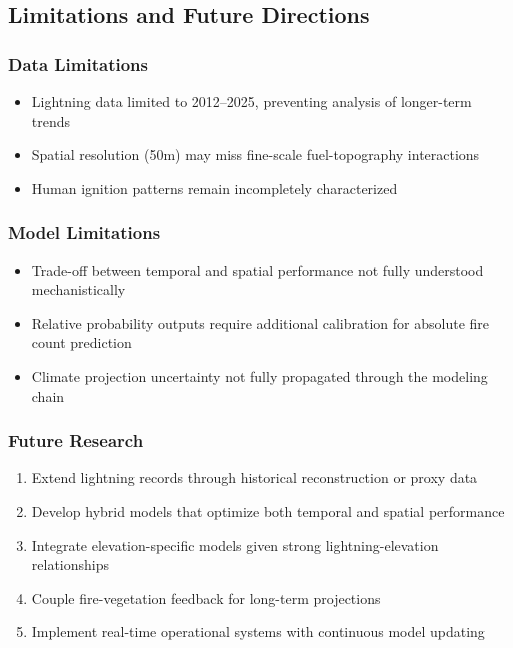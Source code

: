 \documentclass[11pt,a4paper]{article}
\begin{document}
\subsection{Limitations and Future Directions}

\subsubsection{Data Limitations}
\begin{itemize}
    \item Lightning data limited to 2012--2025, preventing analysis of longer-term trends
    \item Spatial resolution (50m) may miss fine-scale fuel-topography interactions
    \item Human ignition patterns remain incompletely characterized
\end{itemize}

\subsubsection{Model Limitations}
\begin{itemize}
    \item Trade-off between temporal and spatial performance not fully understood mechanistically
    \item Relative probability outputs require additional calibration for absolute fire count prediction
    \item Climate projection uncertainty not fully propagated through the modeling chain
\end{itemize}

\subsubsection{Future Research}
\begin{enumerate}
    \item Extend lightning records through historical reconstruction or proxy data
    \item Develop hybrid models that optimize both temporal and spatial performance
    \item Integrate elevation-specific models given strong lightning-elevation relationships
    \item Couple fire-vegetation feedback for long-term projections
    \item Implement real-time operational systems with continuous model updating
\end{enumerate}
\end{document}
